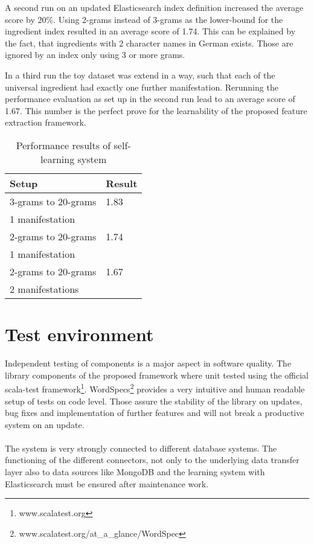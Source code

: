 A second run on an updated Elasticsearch index definition increased the average score by 20\%. Using 2-grams instead of 3-grams as the lower-bound for the ingredient index resulted in an average score of 1.74. This can be explained by the fact, that ingredients with 2 character names in German exists. Those are ignored by an index only using 3 or more grams.

In a third run the toy dataset was extend in a way, such that each of the universal ingredient had exactly one further manifestation. Rerunning the performance evaluation as set up in the second run lead to an average score of 1.67. This number is the perfect prove for the learnability of the proposed feature extraction framework.

\begin{table}[htb]
\centering
\begin{tabular}[t]{|l|l|}
\hline
Setup & Result \\
\hline
\hline
3-grams to 20-grams & 1.83 \\
1 manifestation & \\
\hline
2-grams to 20-grams & 1.74 \\
1 manifestation & \\
\hline
2-grams to 20-grams & 1.67\\ 
2 manifestations & \\
\hline
\end{tabular}
\caption{Performance results of self-learning system}
\label{tab:singlesource}
\end{table}

\section{Test environment\label{sec:testenvir}}

Independent testing of components is a major aspect in software quality. The library components of the proposed framework where unit tested using the official scala-test framework\footnote{www.scalatest.org}. WordSpecs\footnote{www.scalatest.org/at\_a\_glance/WordSpec} provides a very intuitive and human readable setup of tests on code level. Those assure the stability of the library on updates, bug fixes and implementation of further features and will not break a productive system on an update. 
\\\\
The system is very strongly connected to different database systems. The functioning of the different connectors, not only to the underlying data transfer layer also to data sources like MongoDB and the learning system with Elasticsearch must be ensured after maintenance work. 

